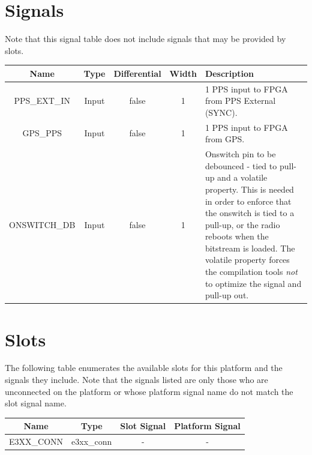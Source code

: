\documentclass{article}
\begin{document}
\section*{Signals}
Note that this signal table does not include signals that may be provided by slots. \\
\begin{tabular}{|c|c|c|c|p{8cm}|}
	\hline
	\rowcolor{blue}
	Name           & Type   & Differential & Width & Description                                          \\
	\hline
	PPS\_EXT\_IN & Input & false        & 1     & 1 PPS input to FPGA from PPS External (SYNC). \\
	\hline
	GPS\_PPS & Input & false        & 1     & 1 PPS input to FPGA from GPS. \\
	\hline
	ONSWITCH\_DB    & Input & false        & 1     & Onswitch pin to be debounced - tied to pull-up and a volatile property. This is needed in order to enforce that the onswitch is tied to a pull-up, or the radio reboots when the bitstream is loaded. The volatile property forces the compilation tools \textit{not} to optimize the signal and pull-up out.\\
	\hline
\end{tabular}
\pagebreak
\section*{Slots}
The following table enumerates the available slots for this platform and the signals they include. Note that the signals listed are only those who are unconnected on the platform or whose platform signal name do not match the slot signal name. \\
\begin{longtable}[l]{|c|c|c|c|}
	\hline
	\rowcolor{blue}
	Name           & Type & Slot Signal & Platform Signal  \\
	\hline
	E3XX\_CONN & e3xx\_conn & - & - \\
	\hline
\end{longtable}
\end{document}
